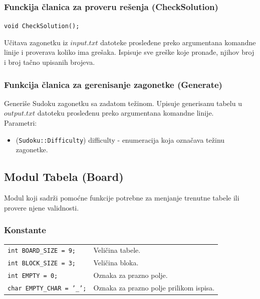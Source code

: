\documentclass[a4paper]{article}
\begin{document}
    \subsubsection{Funckija članica za proveru rešenja (CheckSolution)}
    \texttt{void CheckSolution();}
    \par Učitava zagonetku iz $input.txt$ datoteke prosleđene preko argumentana komandne linije i proverava koliko ima grešaka. Ispisuje sve greške koje pronađe, njihov broj i broj tačno upisanih brojeva.

    \subsubsection{Funkcija članica za gerenisanje zagonetke (Generate)}
    \par Generiše Sudoku zagonetku sa zadatom težinom. Upisuje generisanu tabelu u $output.txt$ datoteku prosleđenu preko argumentana komandne linije.\\
    Parametri:
    \begin{itemize}
        \item (\texttt{Sudoku::Difficulty}) difficulty - enumeracija koja označava težinu zagonetke.
    \end{itemize}
   
    \subsection{Modul Tabela (Board)}
    Modul koji sadrži pomoćne funkcije potrebne za menjanje trenutne tabele ili provere njene validnosti.
    \subsubsection{Konstante}
    \begin{tabular}{ l l }
        \par\texttt{int BOARD\_SIZE = 9;} & Veličina tabele. \\
        \par\texttt{int BLOCK\_SIZE = 3;} & Veličina bloka. \\
        \par\texttt{int EMPTY = 0;}  & Oznaka za prazno polje. \\
        \par\texttt{char EMPTY\_CHAR = '\_';}  & Oznaka za prazno polje prilikom ispisa.
    \end{tabular}
    
\end{document}
